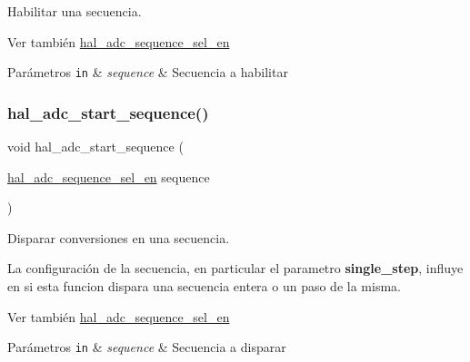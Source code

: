 Habilitar una secuencia. 

\begin{DoxySeeAlso}{Ver también}
\hyperlink{group__ADC_ga9297d7b14d7018a94bce94f0103d8559}{hal\+\_\+adc\+\_\+sequence\+\_\+sel\+\_\+en} 
\end{DoxySeeAlso}

\begin{DoxyParams}[1]{Parámetros}
\mbox{\tt in}  & {\em sequence} & Secuencia a habilitar \\
\hline
\end{DoxyParams}
\mbox{\label{group__ADC_ga154950a81b5f589fde0139178ab1dcf3}} 
\subsubsection{\texorpdfstring{hal\+\_\+adc\+\_\+start\+\_\+sequence()}{hal\_adc\_start\_sequence()}}
{\footnotesize\ttfamily void hal\+\_\+adc\+\_\+start\+\_\+sequence (\begin{DoxyParamCaption}\item[{\hyperlink{group__ADC_ga9297d7b14d7018a94bce94f0103d8559}{hal\+\_\+adc\+\_\+sequence\+\_\+sel\+\_\+en}}]{sequence }\end{DoxyParamCaption})}



Disparar conversiones en una secuencia. 

La configuración de la secuencia, en particular el parametro {\bfseries single\+\_\+step}, influye en si esta funcion dispara una secuencia entera o un paso de la misma.

\begin{DoxySeeAlso}{Ver también}
\hyperlink{group__ADC_ga9297d7b14d7018a94bce94f0103d8559}{hal\+\_\+adc\+\_\+sequence\+\_\+sel\+\_\+en} 
\end{DoxySeeAlso}

\begin{DoxyParams}[1]{Parámetros}
\mbox{\tt in}  & {\em sequence} & Secuencia a disparar \\
\hline
\end{DoxyParams}
\mbox{\label{group__ADC_ga2abe86b92546f8f4726dd65a7a9ddc0d}} 
